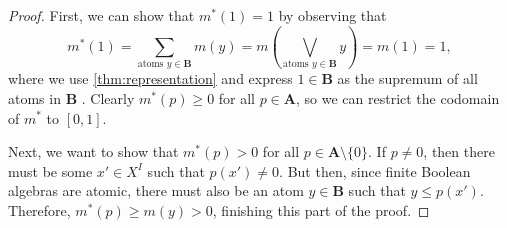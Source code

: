 \documentclass{article}
\theoremstyle{definition}
\theoremstyle{remark}
\begin{document}
\begin{proof}
  First, we can show that $m^*(1) = 1$ by observing that
  \[
    m^*(1) = \sum_{\text{atoms } y \in \mathbf{B}} m(y) = m \left(
      \bigvee_{\text{atoms } y \in \mathbf{B}} y \right) = m(1) = 1,
  \]
  where we use \cref{thm:representation} and express $1 \in \mathbf{B}$ as the
  supremum of all atoms in $\mathbf{B}$ \cite{ganesh2006introduction}. Clearly
  $m^*(p) \ge 0$ for all $p \in \mathbf{A}$, so we can restrict the codomain of
  $m^*$ to $[0, 1]$.

  Next, we want to show that $m^*(p) > 0$ for all $p \in \mathbf{A} \setminus \{
  0 \}$. If $p \ne 0$, then there must be some $x' \in X^I$ such that $p(x') \ne
  0$. But then, since finite Boolean algebras are atomic, there must also be an
  atom $y \in \mathbf{B}$ such that $y \le p(x')$. Therefore, $m^*(p) \ge m(y) >
  0$, finishing this part of the proof.


\end{proof}
\end{document}
